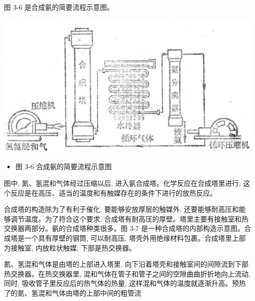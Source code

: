 \documentclass[10pt]{article}
\begin{document}
图 3-6 是合成氨的简要流程示意图。

\begin{center}
\includegraphics[max width=1.0\textwidth]{images/01912d13-9986-7822-a012-3f3f7be99dcb_95_786953.jpg}
\end{center}

\begin{itemize}
\item 图 3-6 合成氨的简要流程示意图
\end{itemize}

图中, 氮、氢混和气体经过压缩以后, 进入氨合成塔。化学反应在合成塔里进行, 这个反应是在高压、适当的温度和有触媒存在的条件下进行的放热反应。

合成塔的构造除为了有利于催化, 要能够安放厚层的触媒外, 还要能够耐高压和能够调节温度。为了符合这个要求, 合成塔有耐高压的厚壁。塔里主要有接触室和热交换器两部分。氨的合成塔种类很多。图 3-7 是一种合成塔的内部构造示意图。合成塔是一个具有厚壁的钢筒, 可以耐高压, 塔壳外用绝缘材料包裹。合成塔里上部为接触室, 内放粒状触媒, 下部是热交换器。

氮、氢混和气体是由塔的上部进入塔里, 向下沿着塔壳和接触室间的间隙流到下部热交换器。在热交换器里, 混和气体在管子和管子之间的空隙曲曲折折地向上流动, 同时, 吸收管子里反应后的热气体的热量, 这样混和气体的温度就逐渐升高。预热了的氮、氢混和气体由塔的上部中间的粗管流
\end{document}
